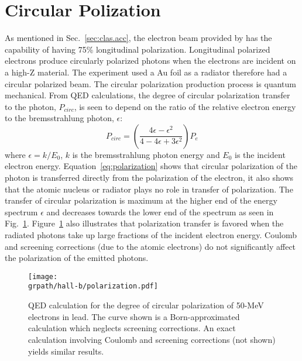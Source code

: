 \section{Circular Polization} \label{sec:clas.polar}

As mentioned in Sec.~\ref{sec:clas.acc}, the electron beam provided by  has the capability of having 75\% longitudinal polarization. Longitudinal polarized electrons produce circularly polarized photons when the electrons are incident on a high-Z material. The experiment  used a Au foil as a radiator therefore  had a circular polarized beam. The circular polarization production process is quantum mechanical. From QED calculations, the degree of circular polarization transfer to the photon, $P_{circ}$, is seen to depend on the ratio of the relative electron energy to the bremsstrahlung photon, $\epsilon$:
\begin{equation}\label{eq:polarization}
	P_{circ} = (\frac{4\epsilon - \epsilon^{2}}{4-4\epsilon+3\epsilon^{2}})P_{e} 
\end{equation}
where $\epsilon = k/E_{0}$, $k$ is the bremsstrahlung photon energy and $E_{0}$ is the incident electron energy. Equation~\ref{eq:polarization} shows that circular polarization of the photon is transferred directly from the polarization of the electron, it also shows that the atomic nucleus or radiator plays no role in transfer of polarization. The transfer of circular polarization is maximum at the higher end of the energy spectrum $\epsilon$ and decreases towards the lower end of the spectrum as seen in Fig.~\ref{fig:jlab.polarization}. Figure~\ref{fig:jlab.polarization} also illustrates that polarization transfer is favored when the radiated photons take up large fractions of the incident electron energy. Coulomb and screening corrections (due to the atomic electrons) do not significantly affect the polarization of the emitted photons. 

\begin{figure}[h!]\begin{center}
\texttt{[image: \\grpath/hall-b/polarization.pdf]}
\caption[Circular polarization Graph]{\label{fig:jlab.polarization}QED calculation for the degree of circular polarization of 50-MeV electrons in lead. The curve shown is a Born-approximated calculation which neglects screening corrections. An exact calculation involving Coulomb and screening corrections (not shown) yields similar results.\cite{Olsen}}
\end{center}\end{figure}
